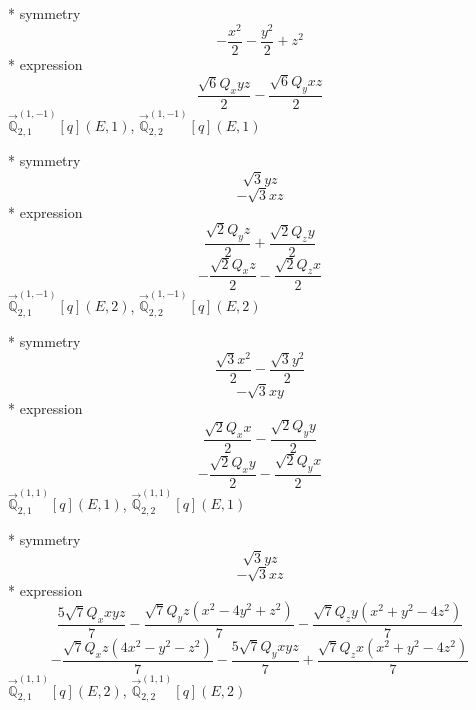 \documentclass[fleqn,8pt]{jsarticle}
\begin{document}
\noindent\quad ** symmetry
\begin{dmath*}
- \frac{x^{2}}{2} - \frac{y^{2}}{2} + z^{2}
\end{dmath*}
\noindent\quad ** expression
\begin{dmath*}
\frac{\sqrt{6} Q_{x} y z}{2} - \frac{\sqrt{6} Q_{y} x z}{2}
\end{dmath*}
\noindent\quad $\vec{\mathbb{Q}}_{2,1}^{(1,-1)}[q](E,1)$, $\vec{\mathbb{Q}}_{2,2}^{(1,-1)}[q](E,1)$

\noindent\quad ** symmetry
\begin{dmath*}
\sqrt{3} y z
\end{dmath*}
\begin{dmath*}
- \sqrt{3} x z
\end{dmath*}
\noindent\quad ** expression
\begin{dmath*}
\frac{\sqrt{2} Q_{y} z}{2} + \frac{\sqrt{2} Q_{z} y}{2}
\end{dmath*}
\begin{dmath*}
- \frac{\sqrt{2} Q_{x} z}{2} - \frac{\sqrt{2} Q_{z} x}{2}
\end{dmath*}
\noindent\quad $\vec{\mathbb{Q}}_{2,1}^{(1,-1)}[q](E,2)$, $\vec{\mathbb{Q}}_{2,2}^{(1,-1)}[q](E,2)$

\noindent\quad ** symmetry
\begin{dmath*}
\frac{\sqrt{3} x^{2}}{2} - \frac{\sqrt{3} y^{2}}{2}
\end{dmath*}
\begin{dmath*}
- \sqrt{3} x y
\end{dmath*}
\noindent\quad ** expression
\begin{dmath*}
\frac{\sqrt{2} Q_{x} x}{2} - \frac{\sqrt{2} Q_{y} y}{2}
\end{dmath*}
\begin{dmath*}
- \frac{\sqrt{2} Q_{x} y}{2} - \frac{\sqrt{2} Q_{y} x}{2}
\end{dmath*}
\noindent\quad $\vec{\mathbb{Q}}_{2,1}^{(1,1)}[q](E,1)$, $\vec{\mathbb{Q}}_{2,2}^{(1,1)}[q](E,1)$

\noindent\quad ** symmetry
\begin{dmath*}
\sqrt{3} y z
\end{dmath*}
\begin{dmath*}
- \sqrt{3} x z
\end{dmath*}
\noindent\quad ** expression
\begin{dmath*}
\frac{5 \sqrt{7} Q_{x} x y z}{7} - \frac{\sqrt{7} Q_{y} z \left(x^{2} - 4 y^{2} + z^{2}\right)}{7} - \frac{\sqrt{7} Q_{z} y \left(x^{2} + y^{2} - 4 z^{2}\right)}{7}
\end{dmath*}
\begin{dmath*}
- \frac{\sqrt{7} Q_{x} z \left(4 x^{2} - y^{2} - z^{2}\right)}{7} - \frac{5 \sqrt{7} Q_{y} x y z}{7} + \frac{\sqrt{7} Q_{z} x \left(x^{2} + y^{2} - 4 z^{2}\right)}{7}
\end{dmath*}
\noindent\quad $\vec{\mathbb{Q}}_{2,1}^{(1,1)}[q](E,2)$, $\vec{\mathbb{Q}}_{2,2}^{(1,1)}[q](E,2)$
\end{document}
